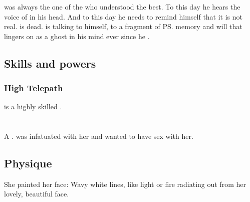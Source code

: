 \subsubsection{\Nexagglachel}
\Azraid{} was always the one of the \satharioth{} who understood  the best. 
To this day he hears the voice of \Nexagglachel{} in his head. 
And to this day he needs to remind himself that it is not real. 
\Nexagglachel{} is dead. 
\Azraid{} is talking to himself, to a fragment of \ps{\Nexagglachel}{} memory and will that lingers on as a ghost in his mind ever since he . 









\subsection{Skills and powers}





\subsubsection{High Telepath}
\Azraid{} is a highly skilled . 















\section[Firaxel]{\Firaxel}
\index{\Firaxel}
A \ketheran{} \resvil. 
\Teshrial{} was infatuated with her and wanted to have sex with her. 









\subsection{Physique}
She painted her face: 
Wavy white lines, like light or fire radiating out from her lovely, beautiful face. 

